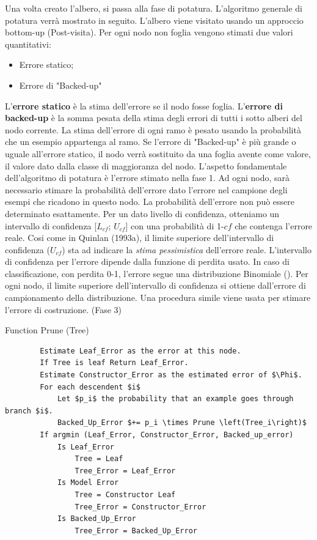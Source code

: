 Una volta creato l'albero, si passa alla fase di potatura. L'algoritmo generale di potatura verrà mostrato in seguito. L'albero viene visitato usando un approccio bottom-up (Post-visita). Per ogni nodo non foglia vengono stimati due valori quantitativi: 
\begin{itemize}
	\item Errore statico;
	\item Errore di "Backed-up"
\end{itemize}
L'\textbf{errore statico} è la stima dell'errore se il nodo fosse foglia.
L'\textbf{errore di backed-up} è la somma pesata della stima degli errori di tutti i sotto alberi del nodo corrente. La stima dell'errore di ogni ramo è pesato usando la probabilità che un esempio appartenga al ramo. Se l'errore di "Backed-up" è più grande o uguale all'errore statico, il nodo verrà sostituito da una foglia avente come valore, il valore dato dalla classe di maggioranza del nodo. L'aspetto fondamentale dell'algoritmo di potatura è l'errore stimato nella fase 1. Ad ogni nodo, sarà necessario stimare la probabilità dell'errore dato l'errore nel campione degli esempi che ricadono in questo nodo. La probabilità dell'errore non può essere determinato esattamente. Per un dato livello di confidenza, otteniamo un intervallo di confidenza [$L_{cf}$; $U_{cf}$] con una probabilità di 1-$cf$ che contenga l'errore reale. Cosi come in Quinlan (1993a), il limite superiore dell'intervallo di confidenza ($U_{cf}$) sta ad indicare la \textit{stima pessimistica} dell'errore reale. L'intervallo di confidenza per l'errore dipende dalla funzione di perdita usato. In caso di classificazione, con perdita 0-1, l'errore segue una distribuzione Binomiale (\cite{mitchellbook}). Per ogni nodo, il limite superiore dell'intervallo di confidenza si ottiene dall'errore di campionamento della distribuzione.
Una procedura simile viene usata per stimare l'errore di costruzione. (Fase 3)


\begin{algorithm}
	\caption{Function Prune (Tree)}
	\begin{lstlisting}
		Estimate Leaf_Error as the error at this node.
		If Tree is leaf Return Leaf_Error.
		Estimate Constructor_Error as the estimated error of $\Phi$.
		For each descendent $i$
			Let $p_i$ the probability that an example goes through branch $i$.
			Backed_Up_Error $+= p_i \times Prune \left(Tree_i\right)$
		If argmin (Leaf_Error, Constructor_Error, Backed_up_error)
			Is Leaf_Error
				Tree = Leaf
				Tree_Error = Leaf_Error
			Is Model Error
				Tree = Constructor Leaf
				Tree_Error = Constructor_Error
			Is Backed_Up_Error
				Tree_Error = Backed_Up_Error
	\end{lstlisting}
\end{algorithm}

